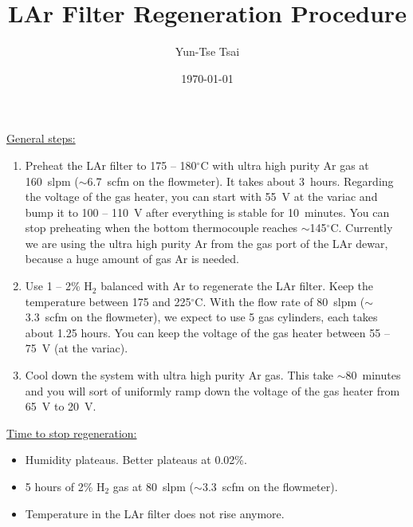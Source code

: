 \documentclass[letterpaper,11pt]{article}
\newcommand{\Hydro}     {H$_2$}
\newcommand{\dC}        {$^\circ$C}
\begin{document}
\title{\textbf{LAr Filter Regeneration Procedure}}
\author{Yun-Tse Tsai}
\date{\today}

\maketitle

\underline{General steps:}
\begin{enumerate}
\setlength\itemsep{-0.2em}
\item Preheat the LAr filter to 175 -- 180{\dC} with ultra high purity Ar gas at 160~slpm 
($\sim$6.7~scfm on the flowmeter).  
It takes about 3~hours.  
Regarding the voltage of the gas heater, you can start with 55~V at the variac and bump it 
to 100 -- 110~V after everything is stable for 10~minutes.  
You can stop preheating when the bottom thermocouple reaches $\sim$145{\dC}.
Currently we are using the ultra high purity Ar from the gas port of the LAr dewar, 
because a huge amount of gas Ar is needed.
\item Use 1 -- 2\% {\Hydro} balanced with Ar to regenerate the LAr filter.  
Keep the temperature between 175 and 225{\dC}.  
With the flow rate of 80~slpm ($\sim$3.3~scfm on the flowmeter), we expect to use 5 gas cylinders, 
each takes about 1.25 hours.  
You can keep the voltage of the gas heater between 55 -- 75~V (at the variac).
\item Cool down the system with ultra high purity Ar gas.  
This take $\sim$80~minutes and you will sort of uniformly ramp down the voltage of 
the gas heater from 65~V to 20~V.
\end{enumerate}

\underline{Time to stop regeneration:}
\begin{itemize}
\setlength\itemsep{-0.2em}
\item Humidity plateaus.  Better plateaus at 0.02\%.
\item 5 hours of 2\% {\Hydro} gas at 80~slpm ($\sim$3.3~scfm on the flowmeter).
\item Temperature in the LAr filter does not rise anymore.
\end{itemize}
\end{document}
